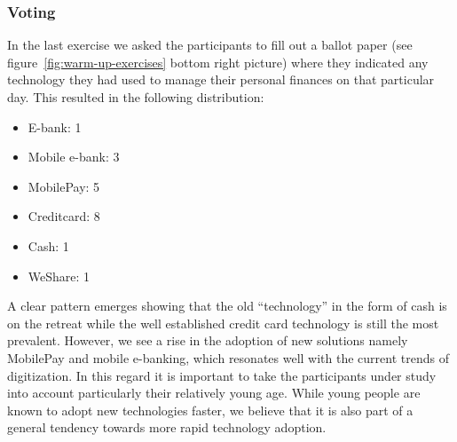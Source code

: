 \subsubsection*{Voting}
In the last exercise we asked the participants to fill out a ballot paper (see figure~\ref{fig:warm-up-exercises} bottom right picture) where they indicated any technology they had used to manage their personal finances on that particular day. This resulted in the following distribution:

\vspace{12pt}
\begin{itemize}
	\item E-bank: 1
	\item Mobile e-bank: 3
	\item MobilePay: 5
	\item Creditcard: 8
	\item Cash: 1
	\item WeShare: 1
\end{itemize}
\vspace{12pt}

A clear pattern emerges showing that the old “technology” in the form of cash is on the retreat while the well established credit card technology is still the most prevalent. However, we see a rise in the adoption of new solutions namely MobilePay and mobile e-banking, which resonates well with the current trends of digitization. In this regard it is important to take the participants under study into account particularly their relatively young age. While young people are known to adopt new technologies faster, we believe that it is also part of a general tendency towards more rapid technology adoption.

